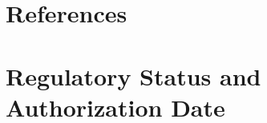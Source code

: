 \section*{References}



\clearpage
\section*{Regulatory Status and Authorization Date}

\clearpage
